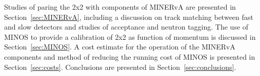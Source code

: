 Studies of paring the 2x2 with components of MINERvA are presented in Section~\ref{sec:MINERvA}, including a discussion on track matching between fast and slow detectors and studies of acceptance and neutron tagging. The use of MINOS to provide a calibration of 2x2 as function of momentum is discussed in Section~\ref{sec:MINOS}. A cost estimate for the operation of the MINERvA components and method of reducing the running cost of MINOS is presented in Section~\ref{sec:costs}. Conclusions are presented in Section~\ref{sec:conclusions}.


